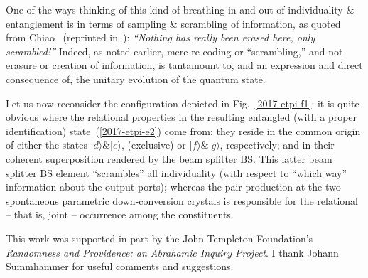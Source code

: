 \documentclass{ws-book9x6}
\begin{document}

One of the ways thinking of this kind of  breathing in and out of individuality {\&} entanglement  is in terms of
sampling  {\&} scrambling of information,
as quoted from Chiao~\cite[p.~27]{green-horn-zei} (reprinted in~\cite{Macchiavello-2001}):
{\em ``Nothing has really been erased here, only scrambled!''}
Indeed, as noted earlier, mere re-coding or ``scrambling,''
and not erasure or creation of information, is tantamount to,
and an expression and direct consequence of,
the unitary evolution of the quantum state.


Let us now reconsider the configuration depicted in Fig.~\ref{2017-etpi-f1}: it is quite obvious where the relational properties
in the resulting entangled (with a proper identification)
state~(\ref{2017-etpi-e2}) come from: they reside in the common origin of either the states
$\vert d \rangle${\&}$\vert e \rangle$,
(exclusive) or
$\vert f \rangle${\&}$\vert g \rangle$,
respectively;
and in their coherent superposition rendered by the beam splitter $\text{BS}$.
This latter beam splitter $\text{BS}$ element ``scrambles'' all individuality (with respect to ``which way'' information about the output ports);
whereas the pair production at the two spontaneous parametric down-conversion crystals
is responsible for the relational -- that is, joint --  occurrence among the constituents.




\begin{acknowledgments}
This work was supported in part by  the John Templeton Foundation's {\em  Randomness and Providence: an Abrahamic Inquiry Project}.
I thank Johann Summhammer for useful comments and suggestions.

\end{acknowledgments}

% 
% 
\end{document}
